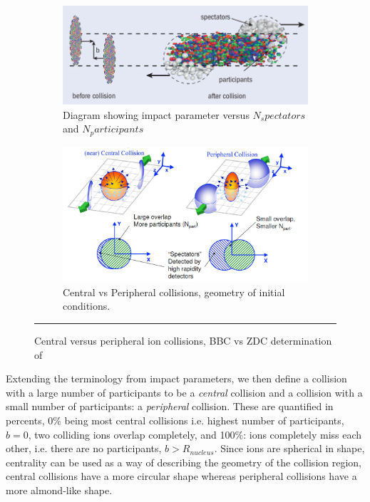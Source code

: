 \begin{figure}[htbp!]
  \centering
    \begin{subfigure}[p]{1\textwidth}
    \includegraphics[width=1\textwidth]{Figures/spectatorsvsparticipants.jpg}
    \caption[Diagram showing impact parameter versus $N_spectators$ and $N_participants$]{Diagram showing impact parameter versus $N_spectators$ and $N_participants$\citep{cernhifireball}}
    \label{fig:cernfireball}
    \end{subfigure}
    \begin{subfigure}[p]{1\textwidth}
    \includegraphics[width=1\textwidth]{Figures/centralvsperipheral.jpg}
	\caption[Central vs Peripheral collisions, geometry of initial conditions]{Central vs Peripheral collisions, geometry of initial conditions.}
    \end{subfigure}
    \rule{35em}{0.5pt}
  \caption[Central versus peripheral ion collisions, BBC vs ZDC determination of]{Central versus peripheral ion collisions, BBC vs ZDC determination of}
  \label{fig:centralvsperipheral}
\end{figure}

Extending the terminology from impact parameters, we then define a collision with a large number of participants to be a \textit{central} collision and a collision with a small number of participants: a \textit{peripheral} collision. These are quantified in percents, 0$\%$ being most central collisions i.e. highest number of participants, $b=0$, two colliding ions overlap completely, and 100$\%$: ions completely miss each other, i.e. there are no participants, $b > R_{nucleus}$. Since ions are spherical in shape, centrality can be used as a way of describing the geometry of the collision region, central collisions have a more circular shape whereas peripheral collisions have a more almond-like shape.



